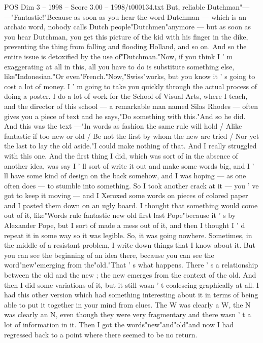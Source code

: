 \begin{textsample}{POS Dim 3 – 1998 – Score 3.00 – 1998/t000134.txt}
But, reliable Dutchman"— —"Fantastic!"Because as soon as you hear the word Dutchman — which is an archaic word, nobody calls Dutch people"Dutchmen"anymore — but as soon as you hear Dutchman, you get this picture of the kid with his finger in the dike, preventing the thing from falling and flooding Holland, and so on.
And so the entire issue is detoxified by the use of"Dutchman."Now, if you think I ' m exaggerating at all in this, all you have to do is substitute something else, like"Indonesian."Or even"French."Now,"Swiss"works, but you know it ' s going to cost a lot of money.
I ' m going to take you quickly through the actual process of doing a poster.
I do a lot of work for the School of Visual Arts, where I teach, and the director of this school — a remarkable man named Silas Rhodes — often gives you a piece of text and he says,"Do something with this."And so he did.
And this was the text —"In words as fashion the same rule will hold / Alike fantastic if too new or old / Be not the first by whom the new are tried / Nor yet the last to lay the old aside."I could make nothing of that.
And I really struggled with this one.
And the first thing I did, which was sort of in the absence of another idea, was say I ' ll sort of write it out and make some words big, and I ' ll have some kind of design on the back somehow, and I was hoping — as one often does — to stumble into something.
So I took another crack at it — you ' ve got to keep it moving — and I Xeroxed some words on pieces of colored paper and I pasted them down on an ugly board.
I thought that something would come out of it, like"Words rule fantastic new old first last Pope"because it ' s by Alexander Pope, but I sort of made a mess out of it, and then I thought I ' d repeat it in some way so it was legible.
So, it was going nowhere.
Sometimes, in the middle of a resistant problem, I write down things that I know about it.
But you can see the beginning of an idea there, because you can see the word"new"emerging from the"old."That ' s what happens.
There ' s a relationship between the old and the new ; the new emerges from the context of the old.
And then I did some variations of it, but it still wasn ' t coalescing graphically at all.
I had this other version which had something interesting about it in terms of being able to put it together in your mind from clues.
The W was clearly a W, the N was clearly an N, even though they were very fragmentary and there wasn ' t a lot of information in it.
Then I got the words"new"and"old"and now I had regressed back to a point where there seemed to be no return.

\end{textsample}
